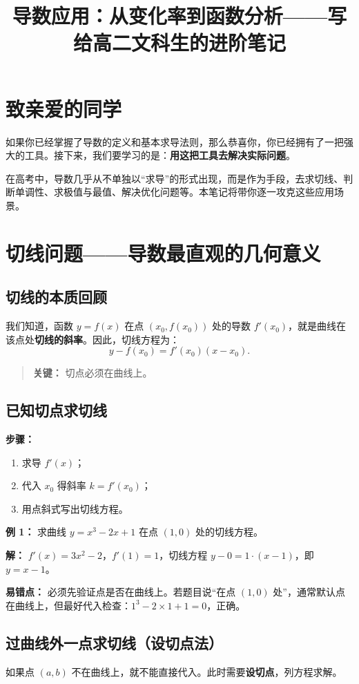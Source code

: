 \documentclass[10pt]{article}
\title{导数应用：从变化率到函数分析——写给高二文科生的进阶笔记}
\author{}
\date{}
\begin{document}
\maketitle

\section*{致亲爱的同学}
如果你已经掌握了导数的定义和基本求导法则，那么恭喜你，你已经拥有了一把强大的工具。接下来，我们要学习的是：\textbf{用这把工具去解决实际问题}。

在高考中，导数几乎从不单独以“求导”的形式出现，而是作为手段，去求切线、判断单调性、求极值与最值、解决优化问题等。本笔记将带你逐一攻克这些应用场景。

\section{切线问题——导数最直观的几何意义}
\subsection{切线的本质回顾}
我们知道，函数 $y=f(x)$ 在点 $(x_0, f(x_0))$ 处的导数 $f'(x_0)$，就是曲线在该点处\textbf{切线的斜率}。因此，切线方程为：
$$y - f(x_0) = f'(x_0)(x - x_0).$$
\begin{quote}
    \textbf{关键：} 切点必须在曲线上。
\end{quote}

\subsection{已知切点求切线}
\textbf{步骤：}
\begin{enumerate}
    \item 求导 $f'(x)$；
    \item 代入 $x_0$ 得斜率 $k = f'(x_0)$；
    \item 用点斜式写出切线方程。
\end{enumerate}

\textbf{例 1：} 求曲线 $y = x^3 - 2x + 1$ 在点 $(1,0)$ 处的切线方程。

\textbf{解：} $f'(x) = 3x^2 - 2$，$f'(1) = 1$，切线方程 $y - 0 = 1 \cdot (x - 1)$，即 $y = x - 1$。

\textbf{易错点：} 必须先验证点是否在曲线上。若题目说“在点 $(1,0)$ 处”，通常默认点在曲线上，但最好代入检查：$1^3 - 2\times1 + 1 = 0$，正确。

\subsection{过曲线外一点求切线（设切点法）}
如果点 $(a,b)$ 不在曲线上，就不能直接代入。此时需要\textbf{设切点}，列方程求解。
\end{document}
